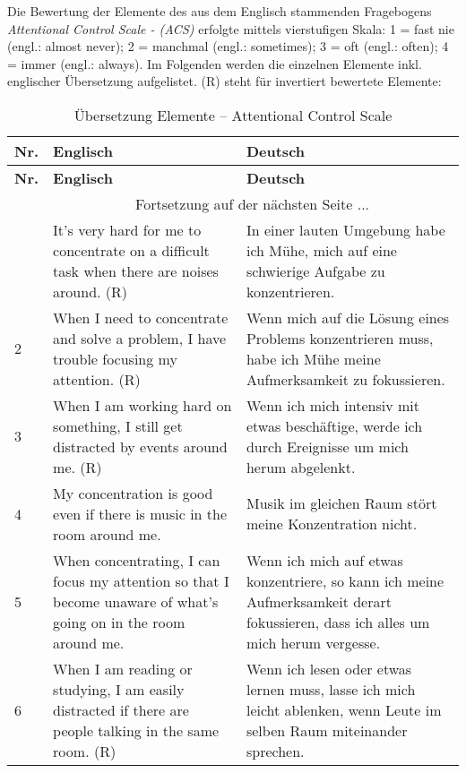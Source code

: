 \begin{RaggedRight}

Die Bewertung der Elemente des aus dem Englisch stammenden Fragebogens \textit{Attentional Control Scale - (ACS)} \cite{Derryberry2002} erfolgte mittels vierstufigen Skala: 1 = fast nie (engl.: almost never); 2 = manchmal (engl.: sometimes); 3 = oft (engl.: often); 4 = immer (engl.: always).\newline
Im Folgenden werden die einzelnen Elemente inkl. englischer Übersetzung aufgelistet. (R) steht für invertiert bewertete Elemente:
\begin{center}
    \begin{longtable}[t]{|l|p{6.6 cm}|p{6.6 cm}|}
    \caption{Übersetzung Elemente -- Attentional Control Scale} \\ \hline
        \textbf{Nr.} & \textbf{Englisch} & \textbf{Deutsch} \\ \hline
        \endfirsthead
        \hline
        \textbf{Nr.} & \textbf{Englisch} & \textbf{Deutsch} \\ \hline
        \endhead 
        & \multicolumn{2}{|c|}{Fortsetzung auf der nächsten Seite $...$ } \\ \hline
        \endfoot
        \hline
        \endlastfoot
        1 & It’s very hard for me to concentrate on a difficult task when there are noises around. (R) & In einer lauten Umgebung habe ich Mühe, mich auf eine schwierige Aufgabe zu konzentrieren.\\ 
        2 & When I need to concentrate and solve a problem, I have trouble focusing my attention. (R) & Wenn mich auf die Lösung eines Problems konzentrieren muss, habe ich Mühe meine Aufmerksamkeit zu fokussieren.\\ 
        3 & When I am working hard on something, I still get distracted by events around me. (R) & Wenn ich mich intensiv mit etwas beschäftige, werde ich durch Ereignisse um mich herum abgelenkt.\\ 
        4 & My concentration is good even if there is music in the room around me. & Musik im gleichen Raum stört meine Konzentration nicht.\\
        5 & When concentrating, I can focus my attention so that I become unaware of what’s going on in the room around me. & Wenn ich mich auf etwas konzentriere,  so kann ich meine Aufmerksamkeit derart fokussieren, dass ich alles um mich herum vergesse. \\
        6 & When I am reading or studying, I am easily distracted if there are people talking in the same room. (R) & Wenn ich lesen oder etwas lernen muss, lasse ich mich leicht ablenken, wenn Leute im selben Raum miteinander sprechen. \\

\end{longtable}
\end{center}
\end{RaggedRight}
